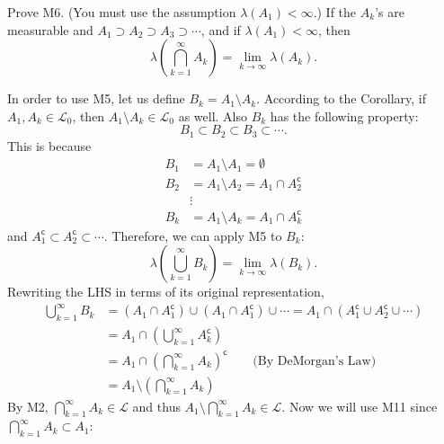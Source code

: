\documentclass[answers]{exam}
\begin{document}
\newpage
{}
\begin{questions}
   \question
   Prove M6. (You must use the assumption $\lambda\left(A_{1}\right) <\infty$.) If the $A_{k}$'s are measurable and $A_{1} \supset A_{2} \supset A_{3} \supset \cdots$, and if $\lambda\left(A_{1}\right) < \infty$, then
   $$
   \lambda\left(\bigcap\limits_{k=1}^{\infty}A_{k} \right) = \lim_{k\to\infty} \lambda\left(A_{k}\right).
   $$
   \begin{solution}
   In order to use M5, let us define $B_{k} = A_{1} \setminus A_{k}$. According to the Corollary, if $A_{1}, A_{k} \in \mathcal{L}_{0}$, then $A_{1}\setminus A_{k} \in \mathcal{L}_{0}$ as well. Also $B_{k}$ has the following property:
   $$
   B_{1} \subset B_{2} \subset B_{3} \subset \cdots.
   $$
   This is because
   \begin{align*}
   B_{1} &= A_{1} \setminus A_{1} = \emptyset\\
   B_{2} &= A_{1} \setminus A_{2} = A_{1} \cap A_{2}^{\mathsf{c}}\\
   &\vdots\\
   B_{k} &= A_{1} \setminus A_{k} = A_{1} \cap A_{k}^{\mathsf{c}}
   \end{align*}
   and $A_{1}^{\mathsf{c}} \subset A_{2}^{\mathsf{c}} \subset \cdots $.
   Therefore, we can apply M5 to $B_{k}$:
   $$
   \lambda\left(\bigcup_{k=1}^{\infty}B_{k}\right) = \lim_{k\to\infty} \lambda\left(B_{k}\right).
   $$
   Rewriting the LHS in terms of its original representation,
   \begin{align*}
   \bigcup_{k=1}^{\infty}B_{k} &= \left(A_{1}\cap A_{1}^{\mathsf{c}}\right) \cup \left(A_{1}\cap A_{1}^{\mathsf{c}}\right) \cup \cdots = A_{1} \cap \left(A_{1}^{\mathsf{c}}\cup A_{2}^{\mathsf{c}}\cup \cdots \right)\\
   &= A_{1} \cap \left(\bigcup_{k=1}^{\infty}A_{k}^{\mathsf{c}} \right)\\
   &= A_{1} \cap \left(\bigcap_{k=1}^{\infty}A_{k} \right)^{\mathsf{c}}\qquad \text{(By DeMorgan's Law)}\\
   &= A_{1}\setminus \left(\bigcap_{k=1}^{\infty}A_{k} \right)
   \end{align*}
   By M2, $\bigcap_{k=1}^{\infty}A_{k} \in \mathcal{L}$ and thus $A_{1}\setminus \bigcap_{k=1}^{\infty}A_{k} \in \mathcal{L}$. Now we will use M11 since $\bigcap_{k=1}^{\infty}A_{k} \subset A_{1}$:

\end{solution}
\end{questions}
\end{document}
